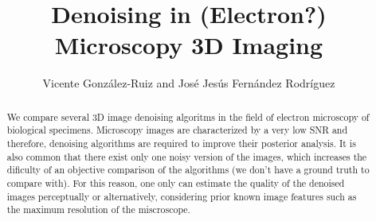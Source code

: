 \documentclass{article}
\title{Denoising in (Electron?) Microscopy 3D Imaging}
\author{Vicente González-Ruiz and José Jesús Fernández Rodríguez}
\begin{document}
\maketitle

\begin{abstract}

  We compare several 3D image denoising algoritms in the field of
  electron microscopy of biological specimens. Microscopy images are
  characterized by a very low SNR and therefore, denoising algorithms
  are required to improve their posterior analysis. It is also common
  that there exist only one noisy version of the images, which
  increases the dificulty of an objective comparison of the algorithms
  (we don't have a ground truth to compare with). For this reason, one
  only can estimate the quality of the denoised images perceptually or
  alternatively, considering prior known image features such as the
  maximum resolution of the miscroscope.

\end{abstract}

\tableofcontents
\end{document}
